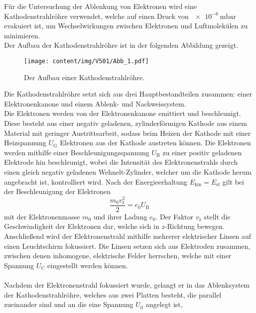     Für die Untersuchung der Ablenkung von Elektronen wird eine Kathodenstrahlröhre verwendet,
    welche auf einen Druck von $\SI{e-6}{\milli\bar}$ evakuiert ist,
    um Wechselwirkungen zwischen Elektronen und Luftmolekülen zu minimieren.\\
    Der Aufbau der Kathodenstrahlröhre ist in der folgenden Abbildung gezeigt.
    \begin{figure}[H]
        \centering
        \texttt{[image: content/img/V501/Abb\_1.pdf]}
        \caption{Der Aufbau einer Kathodenstrahlröhre. \cite{versuchsanleitung501}}
        \label{fig:kathodenstrahlröhre_querschnitt}
    \end{figure}
    Die Kathodenstrahlröhre setzt sich aus drei Hauptbestandteilen zusammen:
    einer Elektronenkanone und einem Ablenk- und Nachweissystem.\\
    Die Elektronen werden von der Elektronenkanone emittiert und beschleunigt.
    Diese besteht aus einer negativ geladenen, zylinderförmigen Kathode
    aus einem Material mit geringer Austrittsarbeit,
    sodass beim Heizen der Kathode mit einer Heizspannung $U_\text{G}$ Elektronen aus der Kathode austreten können.
    Die Elektronen werden mithilfe einer Beschleunigungsspannung $U_\text{B}$ zu einer positiv geladenen Elektrode hin beschleunigt,
    wobei die Intensität des Elektronenstrahls durch einen gleich negativ geladenen Wehnelt-Zylinder,
    welcher um die Kathode herum angebracht ist,
    kontrolliert wird.
    Nach der Energieerhaltung $E_\text{kin} = E_\text{el}$ gilt bei der Beschleunigung der Elektronen
    \begin{equation}
        \frac{m_0 v^2_\text{z}}{2} = e_0 U_\text{B}
        \label{eqn:energieerhaltung_beschleunigung}
    \end{equation}
    mit der Elektronenmasse $m_0$ und ihrer Ladung $e_0$.
    Der Faktor $v_\text{z}$ stellt die Geschwindigkeit der Elektronen dar,
    welche sich in $z$-Richtung bewegen.
    Anschließend wird der Elektronenstrahl mithilfe mehrerer elektrischer Linsen auf einen Leuchtschirm fokussiert.
    Die Linsen setzen sich aus Elektroden zusammen,
    zwischen denen inhomogene,
    elektrische Felder herrschen,
    welche mit einer Spannung $U_\text{C}$ eingestellt werden können.\\
    \\
    Nachdem der Elektronenstrahl fokussiert wurde,
    gelangt er in das Ablenksystem der Kathodenstrahlröhre,
    welches aus zwei Platten besteht,
    die parallel zueinander sind und an die eine Spannung $U_\text{d}$ angelegt ist,
